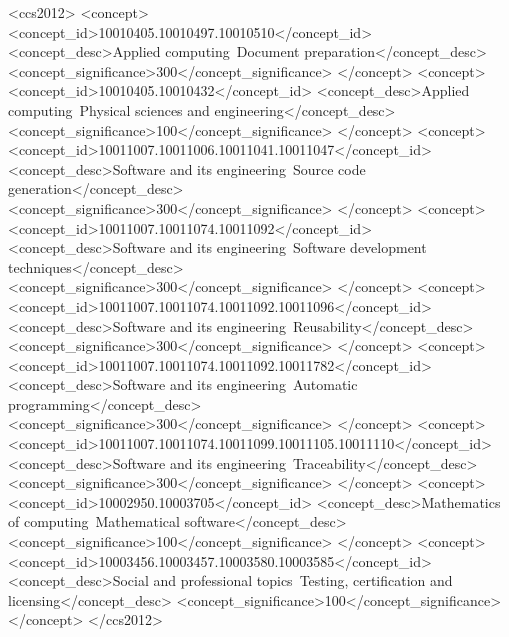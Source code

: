 \documentclass[sigconf]{acmart}
\begin{document}
%
%

\begin{CCSXML}
<ccs2012>
<concept>
<concept_id>10010405.10010497.10010510</concept_id>
<concept_desc>Applied computing~Document preparation</concept_desc>
<concept_significance>300</concept_significance>
</concept>
<concept>
<concept_id>10010405.10010432</concept_id>
<concept_desc>Applied computing~Physical sciences and engineering</concept_desc>
<concept_significance>100</concept_significance>
</concept>
<concept>
<concept_id>10011007.10011006.10011041.10011047</concept_id>
<concept_desc>Software and its engineering~Source code generation</concept_desc>
<concept_significance>300</concept_significance>
</concept>
<concept>
<concept_id>10011007.10011074.10011092</concept_id>
<concept_desc>Software and its engineering~Software development techniques</concept_desc>
<concept_significance>300</concept_significance>
</concept>
<concept>
<concept_id>10011007.10011074.10011092.10011096</concept_id>
<concept_desc>Software and its engineering~Reusability</concept_desc>
<concept_significance>300</concept_significance>
</concept>
<concept>
<concept_id>10011007.10011074.10011092.10011782</concept_id>
<concept_desc>Software and its engineering~Automatic programming</concept_desc>
<concept_significance>300</concept_significance>
</concept>
<concept>
<concept_id>10011007.10011074.10011099.10011105.10011110</concept_id>
<concept_desc>Software and its engineering~Traceability</concept_desc>
<concept_significance>300</concept_significance>
</concept>
<concept>
<concept_id>10002950.10003705</concept_id>
<concept_desc>Mathematics of computing~Mathematical software</concept_desc>
<concept_significance>100</concept_significance>
</concept>
<concept>
<concept_id>10003456.10003457.10003580.10003585</concept_id>
<concept_desc>Social and professional topics~Testing, certification and licensing</concept_desc>
<concept_significance>100</concept_significance>
</concept>
</ccs2012>
\end{CCSXML}

\end{document}
